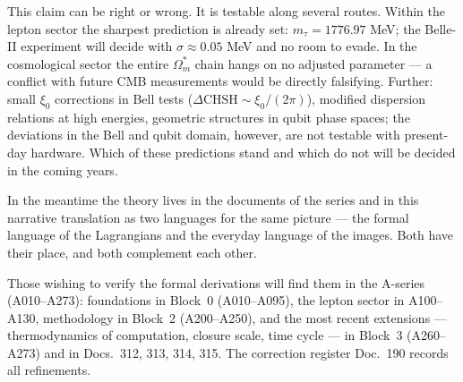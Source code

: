 This claim can be right or wrong. It is testable along several
routes. Within the lepton sector the sharpest prediction is
already set: $m_\tau = 1776.97$ MeV; the Belle-II experiment
will decide with $\sigma \approx 0.05$ MeV and no room to evade.
In the cosmological sector the entire $\Omega_m^*$ chain hangs
on no adjusted parameter --- a conflict with future CMB measurements
would be directly falsifying. Further: small $\xi_0$ corrections
in Bell tests ($\Delta\mathrm{CHSH} \sim \xi_0/(2\pi)$), modified
dispersion relations at high energies, geometric structures in qubit
phase spaces; the deviations in the Bell and qubit domain, however,
are not testable with present-day hardware. Which of these predictions
stand and which do not will be decided in the coming years.

In the meantime the theory lives in the documents of the series
and in this narrative translation as two languages for the same
picture --- the formal language of the Lagrangians and the everyday
language of the images. Both have their place, and both complement
each other.

Those wishing to verify the formal derivations will find them in
the A-series (A010--A273): foundations in Block~0 (A010--A095),
the lepton sector in A100--A130, methodology in Block~2
(A200--A250), and the most recent extensions --- thermodynamics
of computation, closure scale, time cycle --- in Block~3
(A260--A273) and in Docs.~312, 313, 314, 315. The correction
register Doc.~190 records all refinements.
